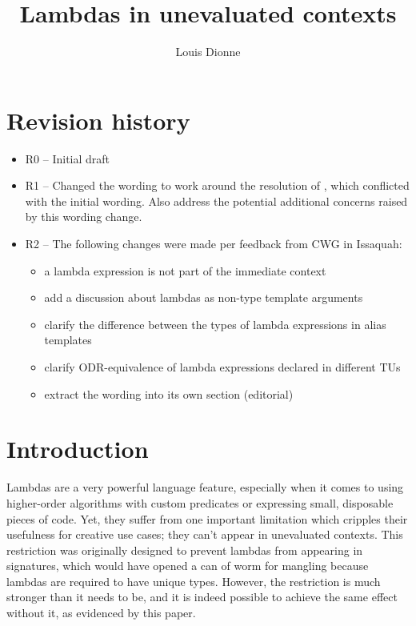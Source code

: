 \documentclass{wg21}
\title{Lambdas in unevaluated contexts}
\author{Louis Dionne}{ldionne.2@gmail.com}
\begin{document}
\maketitle

\section{Revision history}
\begin{itemize}
  \item R0 -- Initial draft
  \item R1 -- Changed the wording to work around the resolution of \cite{DR1607},
              which conflicted with the initial wording. Also address the
              potential additional concerns raised by this wording change.
  \item R2 -- The following changes were made per feedback from CWG in Issaquah:
              \begin{itemize}
                \item a lambda expression is not part of the immediate context
                \item add a discussion about lambdas as non-type template arguments
                \item clarify the difference between the types of lambda expressions
                      in alias templates
                \item clarify ODR-equivalence of lambda expressions declared in
                      different TUs
                \item extract the wording into its own section (editorial)
              \end{itemize}
\end{itemize}


\section{Introduction}
Lambdas are a very powerful language feature, especially when it comes to using
higher-order algorithms with custom predicates or expressing small, disposable
pieces of code. Yet, they suffer from one important limitation which cripples
their usefulness for creative use cases; they can't appear in unevaluated
contexts. This restriction was originally designed to prevent lambdas from
appearing in signatures, which would have opened a can of worm for mangling
because lambdas are required to have unique types. However, the restriction is
much stronger than it needs to be, and it is indeed possible to achieve the
same effect without it, as evidenced by this paper.
\end{document}
